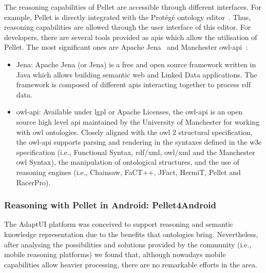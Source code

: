 The reasoning capabilities of Pellet are accessible through different 
interfaces. For example, Pellet is directly integrated with the Protégé ontology 
editor~\citep{protege}. Thus, reasoning capabilities are allowed through the 
user interface of this editor. For developers, there are several tools provided 
as \acsp{api} which allow the utilisation of Pellet. The most significant ones 
are Apache Jena~\citep{jena} and Manchester \ac{owl}-\ac{api}~\citep{owlapi}:

\begin{itemize}
  \item Jena: Apache Jena (or Jena) is a free and open source framework written
  in Java which allows building semantic web and Linked Data applications. The
  framework is composed of different \acp{api} interacting together to process 
  \ac{rdf} data.
  
  \item \ac{owl}-\ac{api}: Available under \ac{lgpl} or Apache Licenses, the 
  \ac{owl}-\ac{api} is an open source high level \ac{api} maintained by the 
  University of Manchester for working with \ac{owl} ontologies. Closely aligned 
  with the \ac{owl} 2 structural specification, the \ac{owl}-\ac{api} supports 
  parsing and rendering in the syntaxes defined in the \ac{w3c} specification 
  (i.e., Functional Syntax, \ac{rdf}/\ac{xml}, \ac{owl}/\ac{xml} and the 
  Manchester \ac{owl} Syntax), the manipulation of ontological structures, and 
  the use of reasoning engines (i.e., Chainsaw, FaCT++, JFact, HermiT, Pellet 
  and RacerPro).  
\end{itemize}



\subsubsection{Reasoning with Pellet in Android: Pellet4Android}
\label{sec:pellet4android}

The AdaptUI platform was conceived to support reasoning and semantic knowledge
representation due to the benefits that ontologies bring. Nevertheless, after
analysing the possibilities and solutions provided by the community (i.e., mobile
reasoning platforms) we found that, although nowadays mobile capabilities allow
heavier processing, there are no remarkable efforts in the area.

